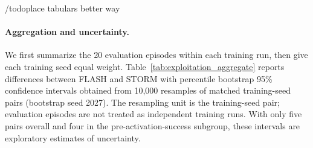 \documentclass{article} %
\begin{document}
/todo{place tabulars better way}

\begin{table}[!t]
\centering
\caption{Frostbite final evaluation results for all five training-seed pairs. Each success or low-return rate uses 20 evaluation episodes, so 5 percentage points correspond to one episode. ``Pre-50k'' indicates whether both methods encountered a training episode with return $\geq 800$ before retrieval activation. All checkpoints were evaluated after 100k training environment steps.}
\label{tab:exploitation_seeds}
\small
\setlength{\tabcolsep}{4pt}
\end{table}

\paragraph{Aggregation and uncertainty.}
We first summarize the 20 evaluation episodes within each training run, then give each training seed equal weight. Table~\ref{tab:exploitation_aggregate} reports differences between FLASH and STORM with percentile bootstrap 95\% confidence intervals obtained from 10,000 resamples of matched training-seed pairs (bootstrap seed 2027). The resampling unit is the training-seed pair; evaluation episodes are not treated as independent training runs. With only five pairs overall and four in the pre-activation-success subgroup, these intervals are exploratory estimates of uncertainty.
\end{document}
